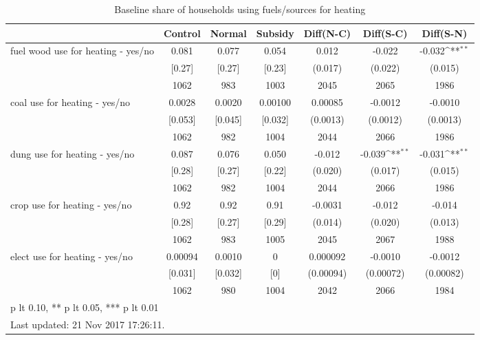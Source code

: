 \begin{table}[htbp]\centering
\def\sym#1{\ifmmode^{#1}\else\(^{#1}\)\fi}
\caption{Baseline share of households using fuels/sources for heating \label{tab:"balance"}}
\begin{tabular*}{1\hsize}{@{\hskip\tabcolsep\extracolsep\fill}l*{1}{cccccc}}
\toprule
                                &  Control&   Normal&  Subsidy&Diff(N-C)         &Diff(S-C)         &Diff(S-N)         \\
\midrule
fuel wood use for heating - yes/no&    0.081&    0.077&    0.054&    0.012         &   -0.022         &   -0.032\sym{**} \\
                                &   [0.27]&   [0.27]&   [0.23]&  (0.017)         &  (0.022)         &  (0.015)         \\
                                &     1062&      983&     1003&     2045         &     2065         &     1986         \\
coal use for heating - yes/no   &   0.0028&   0.0020&  0.00100&  0.00085         &  -0.0012         &  -0.0010         \\
                                &  [0.053]&  [0.045]&  [0.032]& (0.0013)         & (0.0012)         & (0.0013)         \\
                                &     1062&      982&     1004&     2044         &     2066         &     1986         \\
dung use for heating - yes/no   &    0.087&    0.076&    0.050&   -0.012         &   -0.039\sym{**} &   -0.031\sym{**} \\
                                &   [0.28]&   [0.27]&   [0.22]&  (0.020)         &  (0.017)         &  (0.015)         \\
                                &     1062&      982&     1004&     2044         &     2066         &     1986         \\
crop use for heating - yes/no   &     0.92&     0.92&     0.91&  -0.0031         &   -0.012         &   -0.014         \\
                                &   [0.28]&   [0.27]&   [0.29]&  (0.014)         &  (0.020)         &  (0.013)         \\
                                &     1062&      983&     1005&     2045         &     2067         &     1988         \\
elect use for heating - yes/no  &  0.00094&   0.0010&        0& 0.000092         &  -0.0010         &  -0.0012         \\
                                &  [0.031]&  [0.032]&      [0]&(0.00094)         &(0.00072)         &(0.00082)         \\
                                &     1062&      980&     1004&     2042         &     2066         &     1984         \\
\bottomrule
\multicolumn{7}{l}{\footnotesize * p lt 0.10, ** p lt 0.05, *** p lt 0.01}\\
\multicolumn{7}{l}{\footnotesize Last updated: 21 Nov 2017 17:26:11.}\\
\end{tabular*}
\end{table}
